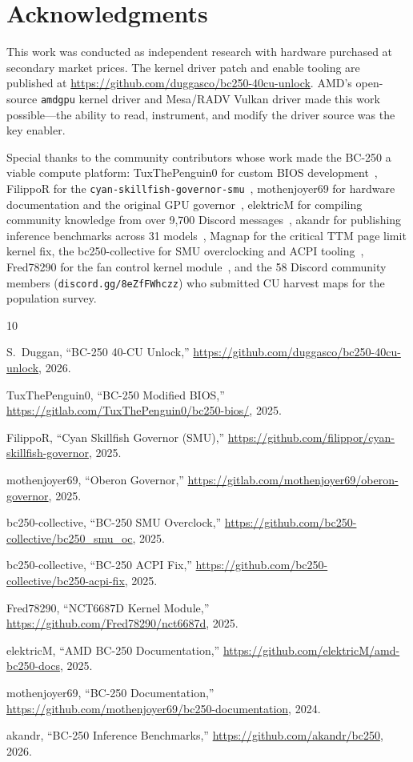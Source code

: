 \documentclass[11pt,twocolumn]{article}
\begin{document}
\onecolumn

\section*{Acknowledgments}

This work was conducted as independent research with hardware purchased at secondary market prices. The kernel driver patch and enable tooling are published at \url{https://github.com/duggasco/bc250-40cu-unlock}. AMD's open-source \texttt{amdgpu} kernel driver and Mesa/RADV Vulkan driver made this work possible---the ability to read, instrument, and modify the driver source was the key enabler.

Special thanks to the community contributors whose work made the BC-250 a viable compute platform: TuxThePenguin0 for custom BIOS development~\cite{bios}, FilippoR for the \texttt{cyan-skillfish-governor-smu}~\cite{governor_smu}, mothenjoyer69 for hardware documentation and the original GPU governor~\cite{mothen,governor}, elektricM for compiling community knowledge from over 9,700 Discord messages~\cite{elektric}, akandr for publishing inference benchmarks across 31 models~\cite{akandr}, Magnap for the critical TTM page limit kernel fix, the bc250-collective for SMU overclocking and ACPI tooling~\cite{smuoc,acpifix}, Fred78290 for the fan control kernel module~\cite{nct6687d}, and the 58 Discord community members (\texttt{discord.gg/8eZfFWhczz}) who submitted CU harvest maps for the population survey.

\begin{thebibliography}{10}

S.~Duggan, ``BC-250 40-CU Unlock,''
\url{https://github.com/duggasco/bc250-40cu-unlock}, 2026.

TuxThePenguin0, ``BC-250 Modified BIOS,''
\url{https://gitlab.com/TuxThePenguin0/bc250-bios/}, 2025.

FilippoR, ``Cyan Skillfish Governor (SMU),''
\url{https://github.com/filippor/cyan-skillfish-governor}, 2025.

mothenjoyer69, ``Oberon Governor,''
\url{https://gitlab.com/mothenjoyer69/oberon-governor}, 2025.

bc250-collective, ``BC-250 SMU Overclock,''
\url{https://github.com/bc250-collective/bc250_smu_oc}, 2025.

bc250-collective, ``BC-250 ACPI Fix,''
\url{https://github.com/bc250-collective/bc250-acpi-fix}, 2025.

Fred78290, ``NCT6687D Kernel Module,''
\url{https://github.com/Fred78290/nct6687d}, 2025.

elektricM, ``AMD BC-250 Documentation,''
\url{https://github.com/elektricM/amd-bc250-docs}, 2025.

mothenjoyer69, ``BC-250 Documentation,''
\url{https://github.com/mothenjoyer69/bc250-documentation}, 2024.

akandr, ``BC-250 Inference Benchmarks,''
\url{https://github.com/akandr/bc250}, 2026.

\end{thebibliography}
\end{document}

